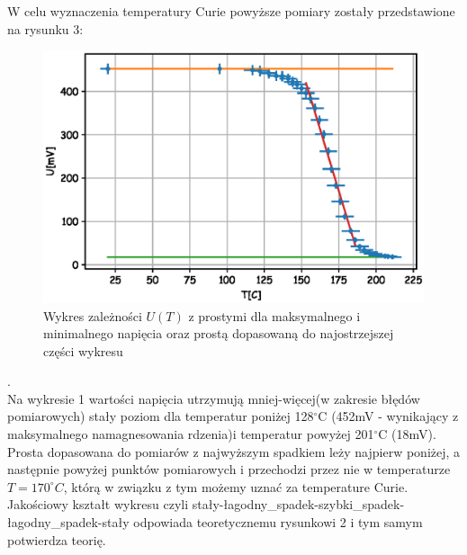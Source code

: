 \documentclass[a4paper,10pt]{article}
\begin{document}
W celu wyznaczenia temperatury Curie powyższe pomiary zostały przedstawione na rysunku 3:
\begin{figure}[H]
  \includegraphics{./Curie_proste.eps}
  \caption{Wykres zależności $U(T)$ z prostymi dla maksymalnego i minimalnego napięcia oraz prostą dopasowaną do najostrzejszej części wykresu}
\end{figure}.
\\Na wykresie 1 wartości napięcia utrzymują mniej-więcej(w zakresie błędów pomiarowych) stały poziom dla temperatur poniżej 128$^\circ$C (452mV -
wynikający z maksymalnego namagnesowania rdzenia)i temperatur powyżej 201$^\circ$C (18mV). Prosta dopasowana do pomiarów z najwyższym spadkiem leży najpierw
poniżej, a następnie powyżej punktów pomiarowych i przechodzi przez nie w temperaturze $T = 170^\circ C$, którą w związku z tym możemy uznać za temperature Curie. Jakościowy kształt wykresu czyli stały-łagodny_spadek-szybki_spadek-łagodny_spadek-stały odpowiada teoretycznemu rysunkowi 2 i tym samym potwierdza teorię.
\end{document}
